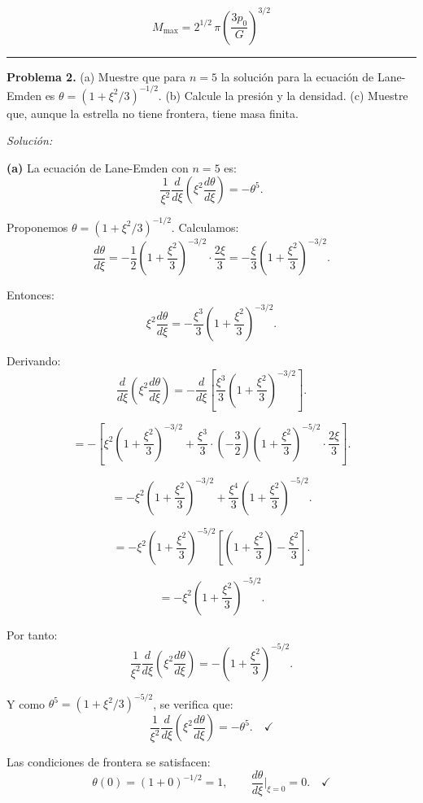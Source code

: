 $$
\boxed{M_{\text{max}} = 2^{1/2}\,\pi\left(\frac{3p_0}{G}\right)^{3/2}}
$$

\vspace{1em}

\noindent\rule{\textwidth}{0.4pt}

\vspace{1em}

\noindent\textbf{Problema 2.} (a) Muestre que para $n=5$ la solución para la ecuación de Lane-Emden es $\theta = (1+\xi^2/3)^{-1/2}$. (b) Calcule la presión y la densidad. (c) Muestre que, aunque la estrella no tiene frontera, tiene masa finita.

\vspace{0.5em}

\noindent\textit{Solución:}

\textbf{(a)} La ecuación de Lane-Emden con $n=5$ es:
$$
\frac{1}{\xi^2}\frac{d}{d\xi}\left(\xi^2\frac{d\theta}{d\xi}\right) = -\theta^5.
$$

Proponemos $\theta = (1+\xi^2/3)^{-1/2}$. Calculamos:
$$
\frac{d\theta}{d\xi} = -\frac{1}{2}\left(1+\frac{\xi^2}{3}\right)^{-3/2}\cdot\frac{2\xi}{3} = -\frac{\xi}{3}\left(1+\frac{\xi^2}{3}\right)^{-3/2}.
$$

Entonces:
$$
\xi^2\frac{d\theta}{d\xi} = -\frac{\xi^3}{3}\left(1+\frac{\xi^2}{3}\right)^{-3/2}.
$$

Derivando:
$$
\frac{d}{d\xi}\left(\xi^2\frac{d\theta}{d\xi}\right) = -\frac{d}{d\xi}\left[\frac{\xi^3}{3}\left(1+\frac{\xi^2}{3}\right)^{-3/2}\right].
$$

$$
= -\left[\xi^2\left(1+\frac{\xi^2}{3}\right)^{-3/2} + \frac{\xi^3}{3}\cdot\left(-\frac{3}{2}\right)\left(1+\frac{\xi^2}{3}\right)^{-5/2}\cdot\frac{2\xi}{3}\right].
$$

$$
= -\xi^2\left(1+\frac{\xi^2}{3}\right)^{-3/2} + \frac{\xi^4}{3}\left(1+\frac{\xi^2}{3}\right)^{-5/2}.
$$

$$
= -\xi^2\left(1+\frac{\xi^2}{3}\right)^{-5/2}\left[\left(1+\frac{\xi^2}{3}\right) - \frac{\xi^2}{3}\right].
$$

$$
= -\xi^2\left(1+\frac{\xi^2}{3}\right)^{-5/2}.
$$

Por tanto:
$$
\frac{1}{\xi^2}\frac{d}{d\xi}\left(\xi^2\frac{d\theta}{d\xi}\right) = -\left(1+\frac{\xi^2}{3}\right)^{-5/2}.
$$

Y como $\theta^5 = (1+\xi^2/3)^{-5/2}$, se verifica que:
$$
\frac{1}{\xi^2}\frac{d}{d\xi}\left(\xi^2\frac{d\theta}{d\xi}\right) = -\theta^5. \quad \checkmark
$$

Las condiciones de frontera se satisfacen:
$$
\theta(0) = (1+0)^{-1/2} = 1, \qquad \frac{d\theta}{d\xi}\bigg|_{\xi=0} = 0. \quad \checkmark
$$


